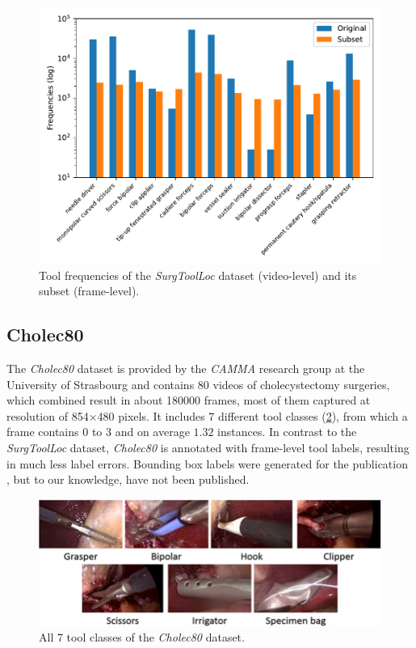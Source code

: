 \begin{figure}[h]
	\centering
	\includegraphics[width=15cm]{4_experiments/images/datasets/surgtoolloc_frequencies.pdf}
	\caption{Tool frequencies of the \emph{SurgToolLoc} dataset (video-level) and its subset (frame-level).}
	\label{fig:surgtoolloc_tool_frequencies}
\end{figure}

\subsection{Cholec80}
The \emph{Cholec80} dataset \cite{endonet} is provided by the \emph{CAMMA} research group at the University of Strasbourg and contains 80 videos of cholecystectomy surgeries, which combined result in about \num{180000} frames, most of them captured at resolution of 854$\times$480 pixels. It includes 7 different tool classes (\ref{fig:cholec80_tools}), from which a frame contains 0 to 3 and on average $1.32$ instances. In contrast to the \emph{SurgToolLoc} dataset, \emph{Cholec80} is annotated with frame-level tool labels, resulting in much less label errors. Bounding box labels were generated for the publication \cite{Vardazaryan}, but to our knowledge, have not been published.

\begin{figure}[h]
	\centering
	\includegraphics[width=13cm]{4_experiments/images/datasets/cholec80_tools.jpg}
	\caption{All 7 tool classes of the \emph{Cholec80} dataset.}
	\label{fig:cholec80_tools}
\end{figure}

